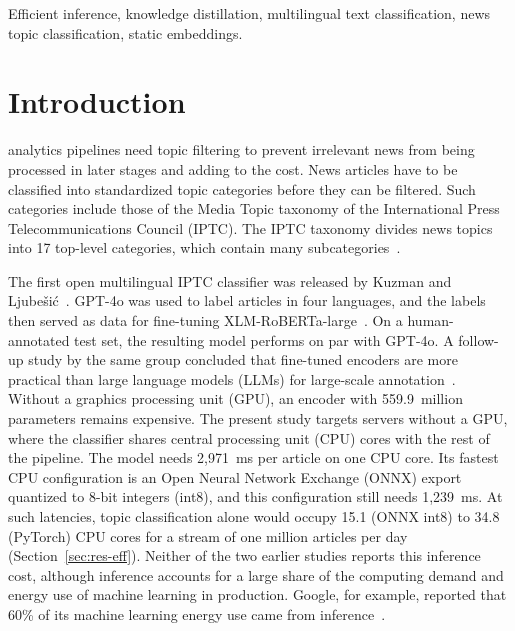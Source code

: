 \documentclass[journal]{IEEEtran}
\begin{document}
\begin{IEEEkeywords}
Efficient inference, knowledge distillation, multilingual text classification, news topic classification, static embeddings.
\end{IEEEkeywords}

\section{Introduction}
\label{sec:introduction}
 analytics pipelines need topic filtering to prevent irrelevant news from being processed in later stages and adding to the cost. News articles have to be classified into standardized topic categories before they can be filtered. Such categories include those of the Media Topic taxonomy of the International Press Telecommunications Council (IPTC). The IPTC taxonomy divides news topics into 17 top-level categories, which contain many subcategories~\cite{iptc2024mediatopics,kuzman2025llm}.

The first open multilingual IPTC classifier was released by Kuzman and Ljube\v{s}i\'c~\cite{kuzman2025llm}. GPT-4o was used to label articles in four languages, and the labels then served as data for fine-tuning XLM-RoBERTa-large~\cite{conneau2020xlmr}. On a human-annotated test set, the resulting model performs on par with GPT-4o. A follow-up study by the same group concluded that fine-tuned encoders are more practical than large language models (LLMs) for large-scale annotation~\cite{kuzman2025southslavic}. Without a graphics processing unit (GPU), an encoder with 559.9~million parameters remains expensive. The present study targets servers without a GPU, where the classifier shares central processing unit (CPU) cores with the rest of the pipeline. The model needs 2,971~ms per article on one CPU core. Its fastest CPU configuration is an Open Neural Network Exchange (ONNX) export quantized to 8-bit integers (int8), and this configuration still needs 1,239~ms. At such latencies, topic classification alone would occupy 15.1 (ONNX int8) to 34.8 (PyTorch) CPU cores for a stream of one million articles per day (Section~\ref{sec:res-eff}). Neither of the two earlier studies reports this inference cost, although inference accounts for a large share of the computing demand and energy use of machine learning in production. Google, for example, reported that 60\% of its machine learning energy use came from inference~\cite{luccioni2024power}.
\end{document}
